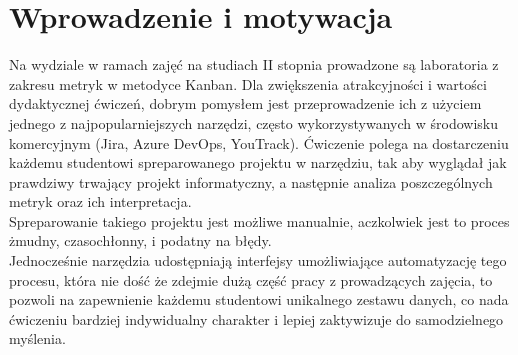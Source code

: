\section{Wprowadzenie i motywacja}
Na wydziale w ramach zajęć na studiach II stopnia prowadzone są laboratoria z zakresu metryk w metodyce Kanban.
Dla zwiększenia atrakcyjności i wartości dydaktycznej ćwiczeń, dobrym pomysłem jest przeprowadzenie ich z użyciem jednego z najpopularniejszych narzędzi,
często wykorzystywanych w środowisku komercyjnym (Jira, Azure DevOps, YouTrack).
Ćwiczenie polega na dostarczeniu każdemu studentowi spreparowanego projektu w narzędziu, tak aby wyglądał jak prawdziwy trwający projekt informatyczny,
a następnie analiza poszczególnych metryk oraz ich interpretacja.\\
Spreparowanie takiego projektu jest możliwe manualnie, aczkolwiek jest to proces żmudny, czasochłonny, i podatny na błędy.\\
Jednocześnie narzędzia udostępniają interfejsy umożliwiające automatyzację tego procesu, która nie dość że zdejmie dużą część pracy z prowadzących zajęcia,
to pozwoli na zapewnienie każdemu studentowi unikalnego zestawu danych, co nada ćwiczeniu bardziej indywidualny charakter i lepiej zaktywizuje do samodzielnego myślenia.\\
